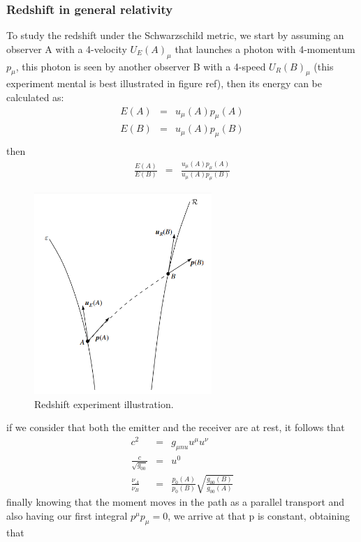 \documentclass[letterpaper,11pt,onecolumn]{article}
\begin{document}
\subsubsection{Redshift in general relativity}
To study the redshift under the Schwarzschild metric, we start by assuming an observer A with a 4-velocity $U_{E}(A)_{\mu}$ that launches a photon with 4-momentum $p_{\mu}$, this photon is seen by another observer B with a 4-speed $U_{R}(B)_{\mu}$ (this experiment mental is best illustrated in figure ref), then its energy can be calculated as:
\begin{eqnarray*}
          E(A)&=&u_{\mu}(A)p_{\mu}(A)\\
          E(B)&=&u_{\mu}(A)p_{\mu}(B)\\
\end{eqnarray*}
then
\begin{eqnarray*}
         \frac{E(A)}{E(B)} &=&\frac{u_{\mu}(A)p_{\mu}(A)}{u_{\mu}(A)p_{\mu}(B)}
\end{eqnarray*}
\begin{figure}[h!]
    \centering
    \includegraphics[width=0.6\textwidth]{Report/Images/3_foton_redshift.png}
    \caption{Redshift experiment illustration.}
\label{rs}
\end{figure}
if we consider that both the emitter and the receiver are at rest, it follows that
        \begin{eqnarray*}
    c^{2}&=& g_{\mu nu} u^{\mu}u^{\nu} \\     
            \frac{c}{\sqrt{g_{00}}}&=&u^{0}\\
         \frac{\nu_{A}}{\nu_{B}} &=&\frac{p_{0}(A)}{p_{0}(B)}  \sqrt{\frac{g_{00}(B)}{g_{00}(A)}}
    \end{eqnarray*}
finally knowing that the moment moves in the path as a parallel transport and also having our first integral $p^{\mu}p_{\mu} = 0$, we arrive at that p is constant, obtaining that
\end{document}
